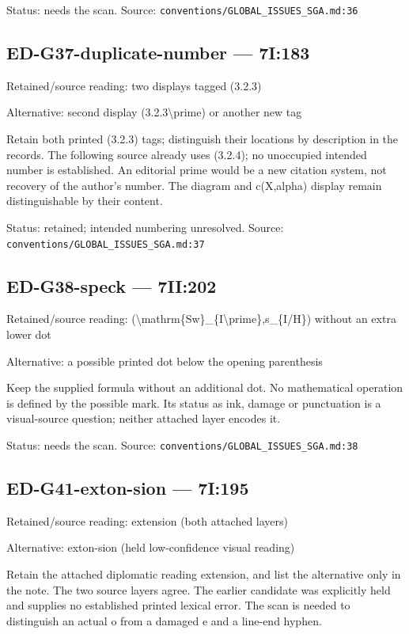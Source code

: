 Status: needs the scan. Source: \nolinkurl{conventions/GLOBAL_ISSUES_SGA.md:36}

\subsection*{ED-G37-duplicate-number — 7I:183}

Retained/source reading: two displays tagged (3.2.3)

Alternative: second display (3.2.3\textbackslash{}prime) or another new tag

Retain both printed (3.2.3) tags; distinguish their locations by description in the records. The following source already uses (3.2.4); no unoccupied intended number is established. An editorial prime would be a new citation system, not recovery of the author’s number. The diagram and c(X,alpha) display remain distinguishable by their content.

Status: retained; intended numbering unresolved. Source: \nolinkurl{conventions/GLOBAL_ISSUES_SGA.md:37}

\subsection*{ED-G38-speck — 7II:202}

Retained/source reading: (\textbackslash{}mathrm\{Sw\}\_\{I\textbackslash{}prime\},s\_\{I/H\}) without an extra lower dot

Alternative: a possible printed dot below the opening parenthesis

Keep the supplied formula without an additional dot. No mathematical operation is defined by the possible mark. Its status as ink, damage or punctuation is a visual-source question; neither attached layer encodes it.

Status: needs the scan. Source: \nolinkurl{conventions/GLOBAL_ISSUES_SGA.md:38}

\subsection*{ED-G41-exton-sion — 7I:195}

Retained/source reading: extension (both attached layers)

Alternative: exton-sion (held low-confidence visual reading)

Retain the attached diplomatic reading extension, and list the alternative only in the note. The two source layers agree. The earlier candidate was explicitly held and supplies no established printed lexical error. The scan is needed to distinguish an actual o from a damaged e and a line-end hyphen.

